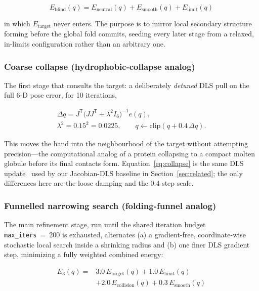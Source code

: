 \documentclass[10pt,conference]{IEEEtran}
\newcommand{\tp}{^{\mathsf{T}}}                       %
\newcommand{\Etgt}{E_{\mathrm{target}}}
\newcommand{\Elim}{E_{\mathrm{limit}}}
\newcommand{\Ecol}{E_{\mathrm{collision}}}
\newcommand{\Esmo}{E_{\mathrm{smooth}}}
\newcommand{\Eneu}{E_{\mathrm{neutral}}}
\newcommand{\Ebld}{E_{\mathrm{blind}}}
\newcommand{\clip}{\mathrm{clip}}
\begin{document}
\begin{equation}
\Ebld(q) = \Eneu(q) + \Esmo(q) + \Elim(q)
\label{eq:eblind}
\end{equation}

in which $\Etgt$ never enters. The purpose is to mirror local secondary
structure forming before the global fold commits, seeding every later stage from
a relaxed, in-limits configuration rather than an arbitrary one.

\subsubsection{Coarse collapse (hydrophobic-collapse analog)}
\label{sec:collapse}
The first stage that consults the target: a deliberately \emph{detuned} DLS pull
on the full 6-D pose error, for 10 iterations,

\begin{equation}
\begin{gathered}
\Delta q = J\tp \big(J J\tp + \lambda^2 I_6\big)^{-1} e(q),\\
\lambda^2 = 0.15^2 = 0.0225, \qquad
q \leftarrow \clip(q + 0.4\,\Delta q).
\end{gathered}
\label{eq:collapse}
\end{equation}

This moves the hand into the neighbourhood of the target without attempting
precision---the computational analog of a protein collapsing to a compact molten
globule before its final contacts form. Equation~\eqref{eq:collapse} is the same
DLS update~\cite{b3,b4} used by our Jacobian-DLS baseline in
Section~\ref{sec:related}; the only differences here are the loose damping and
the 0.4 step scale.

\subsubsection{Funnelled narrowing search (folding-funnel analog)}
The main refinement stage, run until the shared iteration budget
\texttt{max\_iters}~=~200 is exhausted, alternates (a) a gradient-free,
coordinate-wise stochastic local search inside a shrinking radius and (b) one
finer DLS gradient step, minimizing a fully weighted combined energy:

\begin{equation}
\begin{aligned}
E_{3}(q) = {}& 3.0\,\Etgt(q) + 1.0\,\Elim(q)\\
             &+ 2.0\,\Ecol(q) + 0.3\,\Esmo(q)
\end{aligned}
\label{eq:estage3}
\end{equation}
\end{document}
